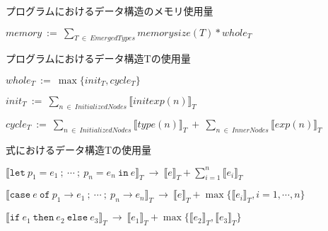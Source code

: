 \begin{figure}[p]
\begin{framed}
  プログラムにおけるデータ構造のメモリ使用量 \vspace{10pt}

  \begin{math}
    memory \ := \
    \sum_{T \ \in \ EmergedTypes} memorysize(T) * whole_T
  \end{math}
  \vspace{25pt}

  プログラムにおけるデータ構造Tの使用量 \vspace{10pt}

  \begin{math}
    whole_T \ := \
    \max \{init_T, cycle_T\}
  \end{math}
  \vspace{10pt}

  \begin{math}
    init_T \ := \
    \sum_{n \ \in \ InitializedNodes} \llbracket initexp(n) \rrbracket _T
  \end{math}
  \vspace{10pt}

  \begin{math}
    cycle_T \ := \
    \sum_{n \ \in \ InitializedNodes} \llbracket type(n) \rrbracket _T
    \ + \
    \sum_{n \ \in \ InnerNodes} \llbracket exp(n) \rrbracket _T
  \end{math}
  \vspace{25pt}

  式におけるデータ構造Tの使用量 \vspace{10pt}

  \begin{math}
    \llbracket \texttt{let} \ p_1 = e_1 \ ; \ \cdots \ ; \ p_n = e_n \ \texttt{in} \ e\rrbracket _T
    \ \rightarrow \
    \llbracket e \rrbracket _T + \sum^n_{i=1} \llbracket e_i \rrbracket _T
  \end{math}
  \vspace{10pt}

  \begin{math}
    \llbracket \texttt{case} \ e \ \texttt{of} \ p_1 \rightarrow e_1 \
    ; \ \cdots \ ; \ p_n \rightarrow e_n \rrbracket _T
    \ \rightarrow \
    \llbracket e \rrbracket _T + \max \{ \llbracket e_i \rrbracket _T, i = 1, \cdots, n \}
  \end{math}
  \vspace{10pt}

  \begin{math}
    \llbracket \texttt{if} \ e_1 \ \texttt{then} \ e_2 \ \texttt{else} \ e_3 \rrbracket _T
    \ \rightarrow \
    \llbracket e_1 \rrbracket _T + \max \{ \llbracket e_2 \rrbracket _T, \llbracket e_3 \rrbracket _T \}
  \end{math}
  \vspace{10pt}


\end{framed}
\end{figure}
